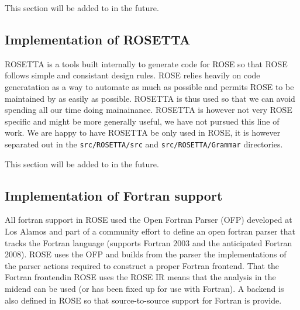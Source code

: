      This section will be added to in the future.
     
\subsection{Implementation of ROSETTA}

    ROSETTA is a tools built internally to generate code for ROSE
so that ROSE follows simple and consistant design rules.  ROSE
relies heavily on code generatation as a way to automate as much
as possible and permits ROSE to be maintained by as easily as possible.
ROSETTA is thus used so that we can avoid spending all our time 
doing mainainance.  ROSETTA is however not very ROSE specific and
might be more generally useful, we have not pursued this line of work.
We are happy to have ROSETTA be only used in ROSE, it is however
separated out in the {\tt src/ROSETTA/src} and {\tt src/ROSETTA/Grammar}
directories.

     This section will be added to in the future.



\subsection{Implementation of Fortran support}

    All fortran support in ROSE used the Open Fortran Parser (OFP)
developed at Los Alamos and part of a community effort to
define an open fortran parser that tracks the Fortran language
(supports Fortran 2003 and the anticipated Fortran 2008).
ROSE uses the OFP and builds from the parser the implementations
of the parser actions required to construct a proper Fortran frontend.
That the Fortran frontendin ROSE uses the ROSE IR means that the
analysis in the midend can be used (or has been fixed up for use with Fortran).
A backend is also defined in ROSE so that source-to-source support for 
Fortran is provide.  
